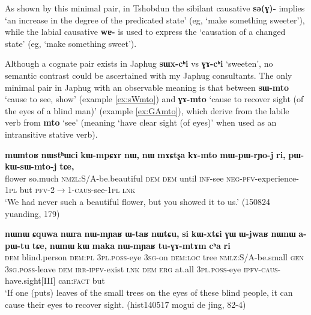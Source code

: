 \documentclass[oneside,a4paper,11pt]{article}
\newcommand{\ipa}[1]{\textbf{{\phon\mbox{#1}}}} %
\newcommand{\forme}[2]{\ipa{#1} `#2'}
\begin{document}
As shown by this minimal pair, in Tshobdun the sibilant causative \ipa{sə(ɣ)-} implies `an increase in the degree  of the predicated state' (eg, `make something sweeter'), while the labial causative \ipa{wɐ-} is used to express the `causation of a changed state' (eg, `make something sweet').

Although a cognate pair exists in Japhug \ipa{sɯx-cʰi} vs \ipa{ɣɤ-cʰi} `sweeten', no semantic contrast could be ascertained with my Japhug consultants. The only minimal pair in Japhug with an observable meaning is that between \forme{sɯ-mto}{cause to see, show} (example \ref{ex:sWmto}) and \forme{ɣɤ-mto}{cause to recover sight (of the eyes of a blind man)} (example \ref{ex:GAmto}), which derive from the labile verb from \forme{mto}{see} (meaning `have clear sight (of eyes)' when used as an intransitive stative verb).


\begin{exe}
\ex \label{ex:sWmto}
\gll
\ipa{mɯntoʁ} 	\ipa{nɯstʰɯci} 	\ipa{kɯ-mpɕɤr} 	\ipa{nɯ,} 	\ipa{nɯ} 	\ipa{mɤɕtʂa} 	\ipa{kɤ-mto} 	\ipa{mɯ-pɯ-rɲo-j} 	\ipa{ri,} 	\ipa{pɯ-kɯ-sɯ-mto-j} 	\ipa{tɕe,} \\
flower so.much \textsc{nmzl}:S/A-be.beautiful \textsc{dem} \textsc{dem}  until \textsc{inf}-see \textsc{neg-pfv}-experience-\textsc{1pl} but \textsc{pfv}-2$\rightarrow$1-\textsc{caus}-see-\textsc{1pl} \textsc{lnk} \\
\glt `We had never such a beautiful flower, but you showed it to us.' (150824 yuanding, 179)
\end{exe}

\begin{exe}
\ex \label{ex:GAmto}
\gll 
\ipa{nɯnɯ} 	\ipa{ɕquwa} 	\ipa{nɯra} 	\ipa{nɯ-mɲaʁ} 	\ipa{ɯ-taʁ} 	\ipa{nɯtɕu,} 	\ipa{si} 	\ipa{kɯ-xtɕi} 	\ipa{ɣɯ} 	\ipa{ɯ-jwaʁ} 	\ipa{nɯnɯ} 	\ipa{a-pɯ-tu} 	\ipa{tɕe,} 	\ipa{nɯnɯ} 	\ipa{kɯ} 	\ipa{maka} 	\ipa{nɯ-mɲaʁ} 	\ipa{tu-ɣɤ-mtɤm} 	\ipa{cʰa} 	\ipa{ri} \\
\textsc{dem} blind.person \textsc{dem:pl} \textsc{3pl.poss}-eye \textsc{3sg}-on \textsc{dem:loc} tree \textsc{nmlz}:S/A-be.small \textsc{gen} \textsc{3sg.poss}-leave \textsc{dem} \textsc{irr-ipfv}-exist \textsc{lnk} \textsc{dem} \textsc{erg} at.all \textsc{3pl.poss}-eye \textsc{ipfv-caus}-have.sight[III] can:\textsc{fact} but \\
\glt `If one (puts) leaves of the small trees on the eyes of these blind people, it can cause their eyes to recover sight. (hist140517 mogui de jing, 82-4)
\end{exe}
\end{document}
